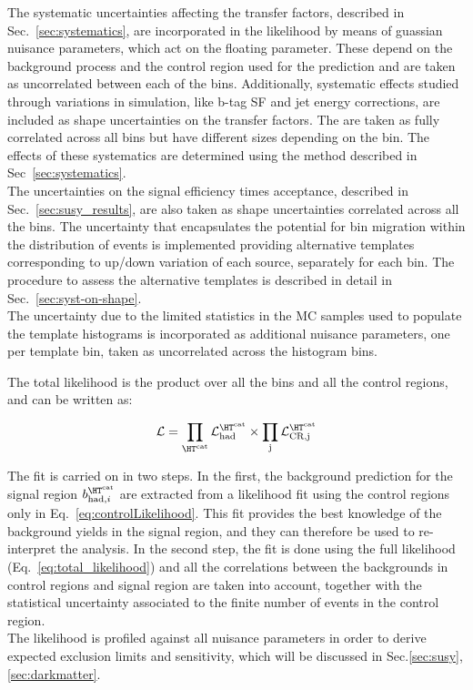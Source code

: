 The systematic uncertainties affecting the transfer factors, described in Sec.~\ref{sec:systematics}, 
are incorporated in the likelihood by means of guassian nuisance parameters, which act on the floating
parameter. These depend on the background process and the control region used for the prediction and
are taken as uncorrelated between each of the \htcat bins. Additionally, systematic effects studied 
through variations in simulation, like b-tag SF and jet energy corrections, are included as shape uncertainties on the transfer factors. 
The are taken as fully correlated across all bins but have different sizes depending on the bin. The effects 
of these systematics are determined using the method described in Sec~\ref{sec:systematics}. \\
The uncertainties on the signal efficiency times acceptance, described in Sec.~\ref{sec:susy_results}, 
are also taken as shape uncertainties correlated across all the \htcat bins. 
The uncertainty that encapsulates the potential for bin migration within the \mht distribution of events is implemented 
providing alternative templates corresponding to up/down variation of each source, separately for each \htcat bin. 
The procedure to assess the alternative templates is described in detail in Sec.~\ref{sec:syst-on-shape}. \\
The uncertainty due to the limited statistics in the MC samples used to populate the template histograms is incorporated 
as additional nuisance parameters, one per template bin, taken as uncorrelated across the histogram bins. 

The total likelihood is the product over all the \htcat bins and all the control regions, and can be written as:

\begin{equation}
\label{eq:total_likelihood}
\mathcal{L} = \prod_{\htcat} \mathcal{L}_{\text{had}}^{\htcat} \times \prod_{\text{j}} \mathcal{L}_{\text{CR,j}}^{\htcat}
\end{equation}

The fit is carried on in two steps. 
In the first, the background prediction for the signal region $b^{\htcat}_{\mathrm{had},i}$ are extracted from a likelihood fit 
using the control regions only in Eq.~\ref{eq:controlLikelihood}. 
This fit provides the best knowledge of the background yields in the signal region, 
and they can therefore be used to re-interpret the analysis. 
In the second step, the fit is done using the full likelihood (Eq.~\ref{eq:total_likelihood}) and all 
the correlations between the backgrounds in control regions and signal region are taken into account, 
together with the statistical uncertainty associated to the finite number of events in the control region. \\
The likelihood is profiled against all nuisance parameters in order to derive expected exclusion limits and sensitivity, 
which will be discussed in Sec.\ref{sec:susy}, \ref{sec:darkmatter}.

